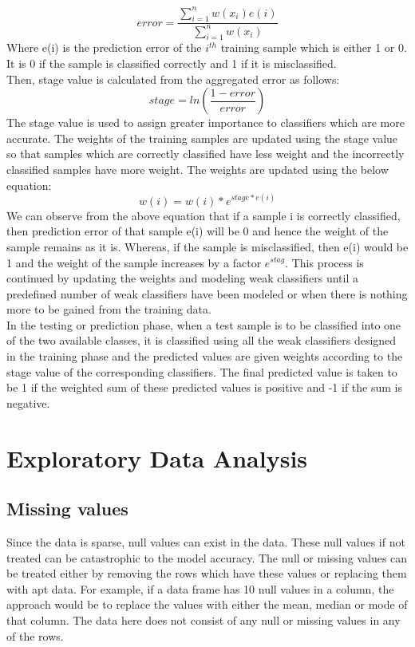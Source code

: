 \documentclass[sigconf]{acmart}
\begin{document}
\begin{equation}
    error = \frac{\sum_{i=1}^{n}w(x_i)e(i)}{\sum_{i=1}^{n}w(x_i)}
\end{equation}
Where e(i) is the prediction error of the $i^{th}$ training sample which is either 1 or 0. It is 0 if the sample is classified correctly and 1 if it is misclassified. \\
Then, stage value is calculated from the aggregated error as follows\cite{Brownlee2016}:
\begin{equation}
    stage = ln(\frac{1-error}{error})
\end{equation}
The stage value is used to assign greater importance to classifiers which are more accurate. The weights of the training samples are updated using the stage value so that samples which are correctly classified have less weight and the incorrectly classified samples have more weight. The weights are updated using the below equation\cite{Brownlee2016}:
\begin{equation}
    w(i) = w(i)*e^{stage*e(i)}
\end{equation}
We can observe from the above equation that if a sample i is correctly classified, then prediction error of that sample e(i) will be 0 and hence the weight of the sample remains as it is. Whereas, if the sample is misclassified, then e(i) would be 1 and the weight of the sample increases by a factor $e^{stag}$. This process is continued by updating the weights and modeling weak classifiers until a predefined number of weak classifiers have been modeled or when there is nothing more to be gained from the training data.\cite{Brownlee2016}\\
In the testing or prediction phase, when a test sample is to be classified into one of the two available classes, it is classified using all the weak classifiers designed in the training phase and the predicted values are given weights according to the stage value of the corresponding classifiers\cite{Brownlee2016}. The final predicted value is taken to be 1 if the weighted sum of these predicted values is positive and -1  if the sum is negative.
\section{Exploratory Data Analysis}
\subsection{Missing values}
Since the data is sparse, null values can exist in the data. These null values if not treated can be catastrophic to the model accuracy. The null or missing values can be treated either by removing the rows which have these values or replacing them with apt data. For example, if a data frame has 10 null values in a column, the approach would be to replace the values with either the mean, median or mode of that column.  The data here does not consist of any null or missing values in any of the rows.
\end{document}
